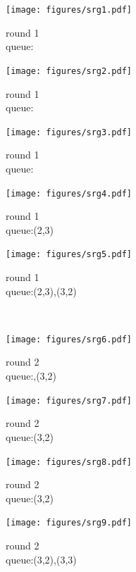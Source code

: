 \documentclass{article}
\begin{document}
\begin{figure}[h]
\centering
\begin{subfigure}[b]{0.2\linewidth}%
\centering
  \texttt{[image: figures/srg1.pdf]}
  \caption{round 1\\queue:}\label{fig:M1}%
\end{subfigure}%
\begin{subfigure}[b]{0.2\linewidth}%
\centering
  \texttt{[image: figures/srg2.pdf]}
  \caption{round 1\\queue:}\label{fig:M2}%
\end{subfigure}%
\begin{subfigure}[b]{0.2\linewidth}%
\centering
  \texttt{[image: figures/srg3.pdf]}
  \caption{round 1\\queue:}\label{fig:M3}%
\end{subfigure}%
\begin{subfigure}[b]{0.2\linewidth}%
\centering
  \texttt{[image: figures/srg4.pdf]}
  \caption{round 1\\queue:(2,3)}\label{fig:M4}%
\end{subfigure}%
\begin{subfigure}[b]{0.2\linewidth}%
\centering
  \texttt{[image: figures/srg5.pdf]}
  \caption{round 1\\queue:(2,3),(3,2)}\label{fig:M5}%
\end{subfigure}\\%
\begin{subfigure}[b]{0.2\linewidth}%
\centering
  \texttt{[image: figures/srg6.pdf]}
  \caption{round 2\\queue:,(3,2)}\label{fig:M6}%
\end{subfigure}%
\begin{subfigure}[b]{0.2\linewidth}%
\centering
  \texttt{[image: figures/srg7.pdf]}
\caption{round 2\\queue:(3,2)}\label{fig:M7}%
\end{subfigure}%
\begin{subfigure}[b]{0.2\linewidth}%
\centering
  \texttt{[image: figures/srg8.pdf]}
\caption{round 2\\queue:(3,2)}\label{fig:M8}%
\end{subfigure}%
\begin{subfigure}[b]{0.2\linewidth}%
\centering
  \texttt{[image: figures/srg9.pdf]}
  \caption{round 2\\queue:(3,2),(3,3)}\label{fig:M9}%
\end{subfigure}%
\begin{subfigure}[b]{0.2\linewidth}%

\end{subfigure}
\end{figure}
\end{document}
